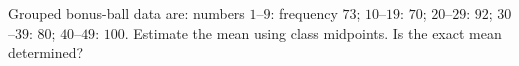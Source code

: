 Grouped bonus-ball data are: numbers $ 1 $--$ 9 $: frequency $ 73 $; $ 10 $--$ 19 $: $ 70 $; $ 20 $--$ 29 $: $ 92 $; $ 30 $--$ 39 $: $ 80 $; $ 40 $--$ 49 $: $ 100 $. Estimate the mean using class midpoints. Is the exact mean determined?
